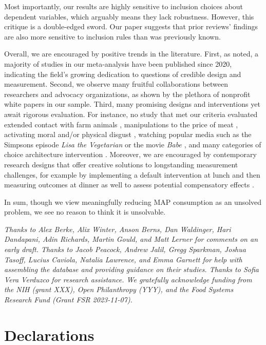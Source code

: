 \documentclass[sn-nature,referee,pdflatex]{sn-jnl}
\begin{document}
Most importantly, our results are highly sensitive to inclusion choices
about dependent variables, which arguably means they lack robustness.
However, this critique is a double-edged sword. Our paper suggests that
prior reviews' findings are also more sensitive to inclusion rules than
was previously known.

Overall, we are encouraged by positive trends in the literature. First,
as noted, a majority of studies in our meta-analysis have been published
since 2020, indicating the field's growing dedication to questions of
credible design and measurement. Second, we observe many fruitful
collaborations between researchers and advocacy organizations, as shown
by the plethora of nonprofit white papers in our sample. Third, many
promising designs and interventions yet await rigorous evaluation. For
instance, no study that met our criteria evaluated extended contact with
farm animals \citep{cerrato2022}, manipulations to the price of meat
\citep{wilde2016}, activating moral and/or physical disgust
\citep{palomo2018}, watching popular media such as the Simpsons episode
\emph{Lisa the Vegetarian} \citep{byrd2010} or the movie \emph{Babe
\citep{novatna2019}}, and many categories of choice architecture
intervention \citep{olafsson2024}. Moreover, we are encouraged by
contemporary research designs that offer creative solutions to
longstanding measurement challenges, for example by implementing a
default intervention at lunch and then measuring outcomes at dinner as
well to assess potential compensatory effects \citep{vocski2024}.

In sum, though we view meaningfully reducing MAP consumption as an
unsolved problem, we see no reason to think it is unsolvable.


\emph{Thanks to Alex Berke, Alix Winter, Anson Berns, Dan Waldinger,
Hari Dandapani, Adin Richards, Martin Gould, and Matt Lerner for
comments on an early draft. Thanks to Jacob Peacock, Andrew Jalil, Gregg
Sparkman, Joshua Tasoff, Lucius Caviola, Natalia Lawrence, and Emma
Garnett for help with assembling the database and providing guidance on
their studies. Thanks to Sofia Vera Verduzco for research assistance. We
gratefully acknowledge funding from the NIH (grant XXX), Open
Philanthropy (YYY), and the Food Systems Research Fund (Grant FSR
2023-11-07).}

\section*{Declarations}\label{declarations}
\end{document}
